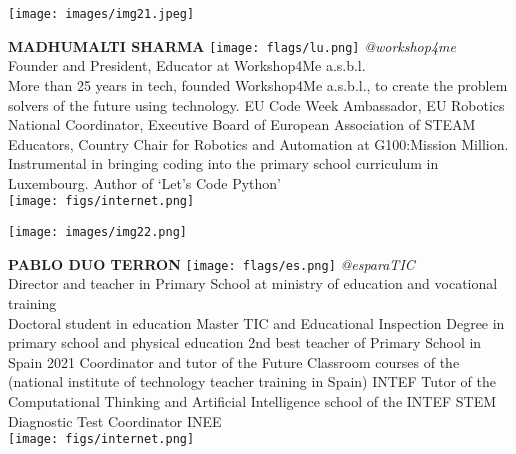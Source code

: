 \noindent
\begin{minipage}{0.3\textwidth}
\centering
\texttt{[image: images/img21.jpeg]}
\end{minipage}
\hfill
\begin{minipage}{0.6\textwidth}\raggedright
\color{color1}\uppercase{\textbf{Madhumalti Sharma}}
\color{color2}\hspace{0.2cm}\texttt{[image: flags/lu.png]}
\hspace{0.2cm}\textit{@workshop4me}
\\
Founder and President, Educator at Workshop4Me a.s.b.l.\\
{\footnotesize More than 25 years in tech, founded Workshop4Me a.s.b.l., to create the problem solvers of the future using technology. EU Code Week Ambassador, EU Robotics National Coordinator, Executive Board of European Association of STEAM Educators, Country Chair for Robotics and Automation at G100:Mission Million. Instrumental in bringing coding into the primary school curriculum in Luxembourg. Author of ‘Let’s Code Python’}\\
\texttt{[image: figs/internet.png]}
\end{minipage}
\newline\newline\newline

\noindent
\begin{minipage}{0.3\textwidth}
\centering
\texttt{[image: images/img22.png]}
\end{minipage}
\hfill
\begin{minipage}{0.6\textwidth}\raggedright
\color{color1}\uppercase{\textbf{Pablo Duo Terron}}
\color{color2}\hspace{0.2cm}\texttt{[image: flags/es.png]}
\hspace{0.2cm}\textit{@esparaTIC}
\\
Director and teacher  in Primary School at ministry of education and vocational training\\
{\footnotesize Doctoral student in education 
Master TIC and Educational Inspection 
Degree in primary school and physical education  
2nd best teacher of Primary School in Spain 2021
Coordinator and tutor of the Future Classroom courses of the (national institute of technology teacher training in Spain) INTEF
Tutor of the Computational Thinking and Artificial Intelligence school of the INTEF
STEM Diagnostic Test Coordinator INEE}\\
\texttt{[image: figs/internet.png]}
\end{minipage}
\newline\newline\newline

